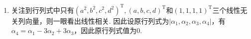 \documentclass[UTF8,12pt,a4paper,fontset=fandol]{ctexart}
\begin{document}
\begin{solve}
\begin{enumerate}
\begin{align*}
\begin{vmatrix}
                                   d^{2} & 2d+1 & 4d+4 & 4
                               \end{vmatrix}    \\
                           & = 4\begin{vmatrix}
                                    a^{2} & 2a & 4a & 1 \\
                                    b^{2} & 2b & 4b & 1 \\
                                    c^{2} & 2c & 4c & 1 \\
                                    d^{2} & 2d & 4d & 1
                                \end{vmatrix}=0.
                      \end{align*}

                \item 关注到行列式中只有$(a^2, b^2, c^2, d^2)^\mathrm{T}, (a, b, c, d)^\mathrm{T}$和$(1, 1, 1, 1)^\mathrm{T}$三个线性无关列向量，则一眼看出线性相关. 因此设原行列式为$|\alpha_1, \alpha_2, \alpha_3, \alpha_4|$，有$\alpha_4=\alpha_1-3\alpha_2+3\alpha_3$，因此原行列式值为0.
            \end{enumerate}
\end{solve}
\end{document}
